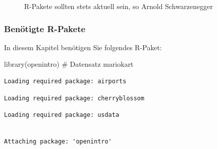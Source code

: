 \documentclass[
  letterpaper,
  DIV=11,
  numbers=noendperiod]{scrartcl}
\newenvironment{Shaded}{\begin{snugshade}}{\end{snugshade}}
\newcommand{\CommentTok}[1]{\textcolor[rgb]{0.37,0.37,0.37}{#1}}
\newcommand{\FunctionTok}[1]{\textcolor[rgb]{0.28,0.35,0.67}{#1}}
\newcommand{\NormalTok}[1]{\textcolor[rgb]{0.00,0.23,0.31}{#1}}
\theoremstyle{definition}
\theoremstyle{definition}
\theoremstyle{definition}
\theoremstyle{remark}
\begin{document}

\begin{figure}


\caption{\label{fig-arnie}R-Pakete sollten stets aktuell sein, so Arnold
Schwarzenegger}

\end{figure}%

\subsubsection{Benötigte R-Pakete}\label{benuxf6tigte-r-pakete}

In diesem Kapitel benötigen Sie folgendes R-Paket:

\begin{Shaded}
\begin{Highlighting}[]
\FunctionTok{library}\NormalTok{(openintro)  }\CommentTok{\# Datensatz \textasciigrave{}mariokart\textasciigrave{}}
\end{Highlighting}
\end{Shaded}

\begin{verbatim}
Loading required package: airports
\end{verbatim}

\begin{verbatim}
Loading required package: cherryblossom
\end{verbatim}

\begin{verbatim}
Loading required package: usdata
\end{verbatim}

\begin{verbatim}

Attaching package: 'openintro'
\end{verbatim}
\end{document}
